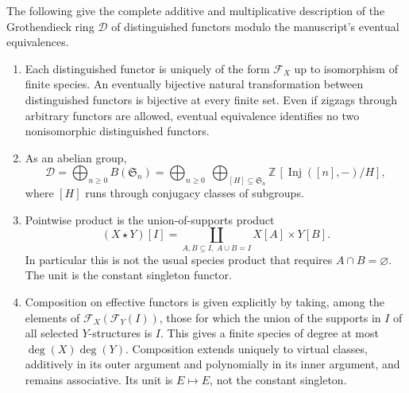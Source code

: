 \begin{theorem}
\label{C:distinguished_ring}
The following give the complete additive and multiplicative description of
the Grothendieck ring $\mathcal D$ of distinguished functors modulo the
manuscript's eventual equivalences.
\begin{enumerate}
\item Each distinguished functor is uniquely of the form $\mathcal F_X$ up
to isomorphism of finite species. An eventually bijective natural
transformation between distinguished functors is bijective at every finite
set. Even if zigzags through arbitrary functors are allowed, eventual
equivalence identifies no two nonisomorphic distinguished functors.
\item As an abelian group,
\[
 \mathcal D=\bigoplus_{n\geq0}B(\mathfrak S_n)
 =\bigoplus_{n\geq0}\ 
   \bigoplus_{[H]\subseteq\mathfrak S_n}\mathbb Z\,[\operatorname{Inj}([n],-)/H],
\]
where $[H]$ runs through conjugacy classes of subgroups.
\item Pointwise product is the union-of-supports product
\[
 (X\star Y)[I]=\coprod_{A,B\subseteq I,\ A\cup B=I}X[A]\times Y[B].
\]
In particular this is not the usual species product that requires
$A\cap B=\varnothing$. The unit is the constant singleton functor.
\item Composition on effective functors is given explicitly by taking,
among the elements of $\mathcal F_X(\mathcal F_Y(I))$, those for which the
union of the supports in $I$ of all selected $Y$-structures is $I$.
This gives a finite species of degree at most $\deg(X)\deg(Y)$.
Composition extends uniquely to virtual classes, additively in its outer
argument and polynomially in its inner argument, and remains associative.
Its unit is $E\mapsto E$, not the constant singleton.
\end{enumerate}
\end{theorem}
